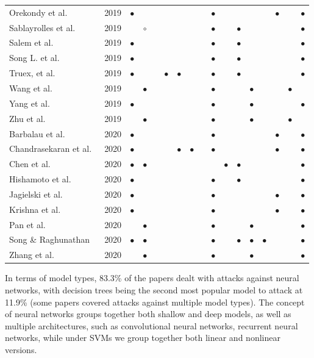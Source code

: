 \begin{table}[t]
\begin{tabular}{@{} l c | c c | c c c c c c c | c c  c c | c c @{} }
Orekondy et al.~ & 2019 & $\bullet$ & & & & & & &$\bullet$ & & & & & $\bullet$ & & $\bullet$\\
Sablayrolles et al.~ & 2019 & & $\circ$ & & & & & & $\bullet$ & & $\bullet$ & & &  & &$\bullet$ \\
Salem et al.~ & 2019 & $\bullet$   & & & & & & & $\bullet$ &  & $\bullet$ & & &  & & $\bullet$\\
Song L. et al.~ & 2019 & $\bullet$ &  & & & & & & $\bullet$&  & $\bullet$ & & & & & $\bullet$ \\
Truex, et al.~ & 2019 & $\bullet$ & & & $\bullet$ & $\bullet$ & & & $\bullet$ & & $\bullet$ & & & & & $\bullet$\\
 Wang et al.~ & 2019 & & $\bullet$ & & & & &  & $\bullet$ &  & & $\bullet$ & & & $\bullet$ & \\
Yang et al.~ & 2019 & $\bullet$ & & & & & & & $\bullet$ &  & & $\bullet$ & & & & $\bullet$ \\
 Zhu et al.~ & 2019 &  & $\bullet$   & & & & & & $\bullet$ &  & & $\bullet$ & & & $\bullet$ & \\
Barbalau et al.~ & 2020 & $\bullet$ & & & & & & &$\bullet$ & & & & & $\bullet$ & & $\bullet$ \\
 Chandrasekaran et al.~ & 2020 & $\bullet$ & &  &  &$\bullet$  & $\bullet$ & &$\bullet$ & & & & & $\bullet$ & & $\bullet$\\
Chen et al.~ & 2020 & $\bullet$ & $\bullet$ & & & & & & & $\bullet$ & $\bullet$ & & & & & $\bullet$ \\
Hishamoto et al.~ & 2020 & $\bullet$ & & & & & & &$\bullet$ & & $\bullet$ & & & & & $\bullet$\\
Jagielski et al.~ & 2020 & $\bullet$ & & & & & & &$\bullet$ & & & & & $\bullet$ & & $\bullet$\\
Krishna et al.~ & 2020 & $\bullet$ & & & & & & &$\bullet$ & & & & & $\bullet$ & & $\bullet$\\
Pan et al.~ & 2020 & & $\bullet$ & & & & & &$\bullet$ & & & $\bullet$ & &  & & $\bullet$\\
Song \& Raghunathan~ & 2020 & $\bullet$ & $\bullet$ &  & & & & &$\bullet$ & & $\bullet$ & $\bullet$ & $\bullet$ & & & $\bullet$\\
Zhang et al.~ & 2020 & & $\bullet$ & & & & & &$\bullet$ & & & $\bullet$ & &  & & $\bullet$\\
\bottomrule
\end{tabular}
\label{table:attack_summary}
\end{table}
In terms of model types, 83.3\% of the papers dealt with attacks against neural networks, with decision trees being the second most popular model to attack at 11.9\% (some papers covered attacks against multiple model types). The concept of neural networks groups together both shallow and deep models, as well as multiple architectures, such as convolutional neural networks, recurrent neural networks, while under SVMs we group together both linear and nonlinear versions. 
